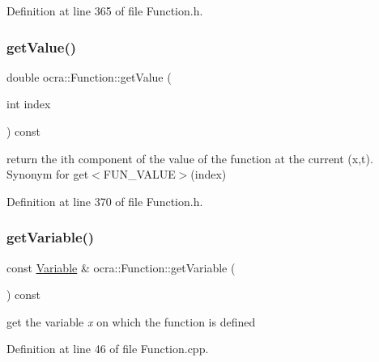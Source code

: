 Definition at line 365 of file Function.\+h.

\hypertarget{classocra_1_1Function_a4447b2e6194552d6536f37f0156b9c29}{}\label{classocra_1_1Function_a4447b2e6194552d6536f37f0156b9c29} 
\subsubsection{\texorpdfstring{get\+Value()}{getValue()}\hspace{0.1cm}{\footnotesize\ttfamily [2/2]}}
{\footnotesize\ttfamily double ocra\+::\+Function\+::get\+Value (\begin{DoxyParamCaption}\item[{int}]{index }\end{DoxyParamCaption}) const\hspace{0.3cm}{\ttfamily [inline]}}

return the ith component of the value of the function at the current (x,t). Synonym for get$<$\+F\+U\+N\+\_\+\+V\+A\+L\+U\+E$>$(index) 

Definition at line 370 of file Function.\+h.

\hypertarget{classocra_1_1Function_a6748e5c8a2bb40655bf574baac33dfdd}{}\label{classocra_1_1Function_a6748e5c8a2bb40655bf574baac33dfdd} 
\subsubsection{\texorpdfstring{get\+Variable()}{getVariable()}\hspace{0.1cm}{\footnotesize\ttfamily [1/2]}}
{\footnotesize\ttfamily const \hyperlink{classocra_1_1Variable}{Variable} \& ocra\+::\+Function\+::get\+Variable (\begin{DoxyParamCaption}{ }\end{DoxyParamCaption}) const}

get the variable {\itshape x} on which the function is defined 

Definition at line 46 of file Function.\+cpp.

\hypertarget{classocra_1_1Function_a2528d95d06e21e60eff14bb3ee484345}{}\label{classocra_1_1Function_a2528d95d06e21e60eff14bb3ee484345} 

